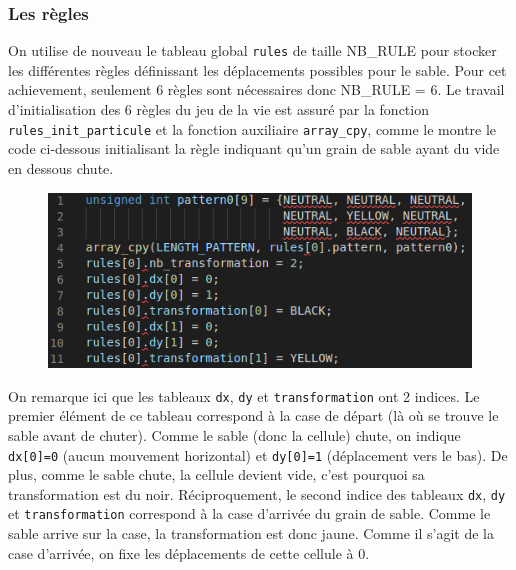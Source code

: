 \documentclass[a4paper]{article}
\begin{document}
\subsubsection{Les règles}
On utilise de nouveau le tableau global \texttt{rules} de taille {\small NB\_RULE} pour stocker les différentes règles définissant les déplacements possibles pour le sable. Pour cet achievement, seulement 6 règles sont nécessaires donc {\small NB\_RULE = 6}.
Le travail d'initialisation des 6 règles du jeu de la vie est assuré par la fonction \texttt{rules\_init\_particule} et la fonction auxiliaire \texttt{array\_cpy}, comme le montre le code ci-dessous initialisant la règle indiquant qu'un grain de sable ayant du vide en dessous chute.
\newpage
\begin{figure}[htb]
    \centering
    \includegraphics[scale=0.7]{img/pattern.png}
\end{figure}
\indent On remarque ici que les tableaux \texttt{dx}, \texttt{dy} et \texttt{transformation} ont 2 indices. Le premier élément de ce tableau correspond à la case de départ (là où se trouve le sable avant de chuter). Comme le sable (donc la cellule) chute, on indique \texttt{dx[0]=0} (aucun mouvement horizontal) et \texttt{dy[0]=1} (déplacement vers le bas). De plus, comme le sable chute, la cellule devient vide, c'est pourquoi sa transformation est du noir. Réciproquement, le second indice des tableaux \texttt{dx}, \texttt{dy} et \texttt{transformation} correspond à la case d'arrivée du grain de sable. Comme le sable arrive sur la case, la transformation est donc jaune. Comme il s'agit de la case d'arrivée, on fixe les déplacements de cette cellule à 0.
\\
\end{document}
